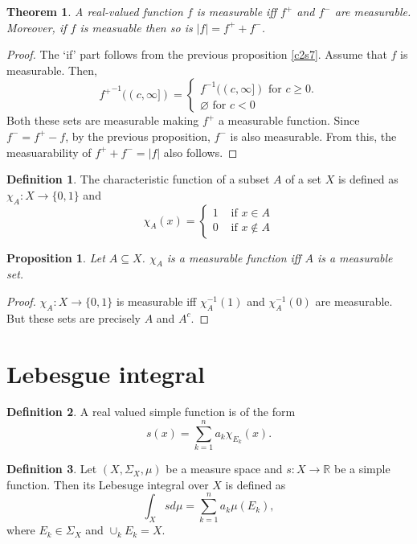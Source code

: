\documentclass{article}
\newcommand{\sor}{\mathbb{R}}
\theoremstyle{plain}
\newtheorem{thm}{Theorem}
\numberwithin{thm}{section}
\theoremstyle{plain}
\newtheorem{prop}{Proposition}
\numberwithin{prop}{section}
\theoremstyle{definition}
\newtheorem{defn}{Definition}
\numberwithin{defn}{section}
\theoremstyle{remark}
\numberwithin{equation}{section}
\begin{document}
\begin{thm}\label{s1t1}
A real-valued function $f$ is measurable iff $f^+$ and $f^-$ are measurable. 
Moreover, if $f$ is measuable then so is $|f| = f^+ + f^-$.
\end{thm}
\begin{proof}
The `if' part follows from the previous proposition \ref{c2s7}. Assume that
$f$ is measurable. Then,
\[
{f^+}^{-1}((c, \infty]) = \begin{cases}
f^{-1}((c, \infty]) \text{ for } c \ge 0. \\
\varnothing \text{ for } c < 0
\end{cases}
\]
Both these sets are measurable making $f^+$ a measurable function. Since $f^- =
f^+ - f$, by the previous proposition, $f^-$ is also measurable. From this, the
measuarability of $f^+ + f^- = |f|$ also follows.
\end{proof}

\begin{defn}\label{s2c3}
The characteristic function of a subset $A$ of a set $X$ is defined as
$\chi_A: X \rightarrow \{0, 1\}$ and
\[
\chi_A(x) = \begin{cases} 1 & \text{ if } x \in A \\
0 & \text{ if } x \notin A
\end{cases}
\]
\end{defn}

\begin{prop}\label{s2p8}
Let $A \subseteq X$. $\chi_A$ is a measurable function iff $A$ is a measurable
set.
\end{prop}
\begin{proof}
$\chi_A: X \rightarrow \{0, 1\}$ is measurable iff $\chi_A^{-1}(1)$ and 
$\chi_A^{-1}(0)$ are measurable. But these sets are precisely $A$ and $A^c$.
\end{proof}

\section{Lebesgue integral}\label{s3}
\begin{defn}\label{s3d1}
A real valued simple function is of the form
\[
s(x) = \sum_{k=1}^n a_k \chi_{E_k}(x).
\]
\end{defn}

\begin{defn}\label{s3d2}
Let $(X, \Sigma_X, \mu)$ be a measure space and $s: X \rightarrow \sor$ be
a simple function. Then its Lebesuge integral over $X$ is defined as
\[
\int_Xs d\mu = \sum_{k=1}^na_k\mu(E_k),
\]
where $E_k \in \Sigma_X$ and $\cup_k E_k = X$.
\end{defn}
\end{document}
